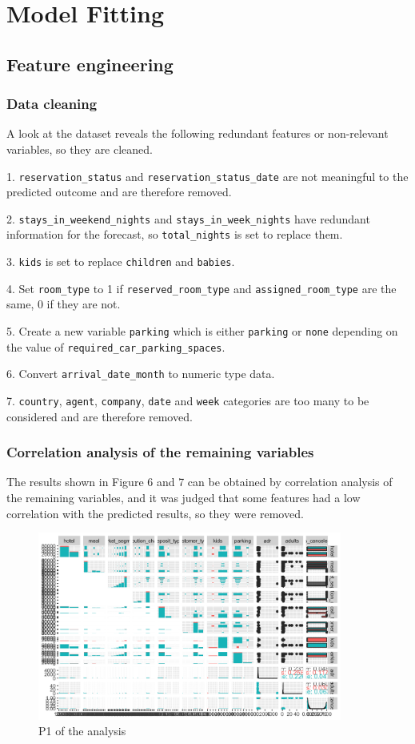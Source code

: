 \documentclass{article}
\begin{document}
\section{Model Fitting}

\subsection{Feature engineering}

\subsubsection{Data cleaning}

A look at the dataset reveals the following redundant features or non-relevant variables, so they are cleaned.

1. \verb|reservation_status| and \verb|reservation_status_date| are not meaningful to the predicted outcome and are therefore removed.

2. \verb|stays_in_weekend_nights| and \verb|stays_in_week_nights| have redundant information for the forecast, so \verb|total_nights| is set to replace them.

3. \verb|kids| is set to replace \verb|children| and \verb|babies|.

4. Set \verb|room_type| to 1 if \verb|reserved_room_type| and \verb|assigned_room_type| are the same, 0 if they are not.

5. Create a new variable \verb|parking| which is either \verb|parking| or \verb|none| depending on the value of \verb|required_car_parking_spaces|.

6. Convert \verb|arrival_date_month| to numeric type data.

7. \verb|country|, \verb|agent|, \verb|company|, \verb|date| and \verb|week| categories are too many to be considered and are therefore removed.


\subsubsection{Correlation analysis of the remaining variables}

The results shown in Figure 6 and 7 can be obtained by correlation analysis of the remaining variables, and it was judged that some features had a low correlation with the predicted results, so they were removed.

\begin{figure}[h]
\centering
\includegraphics[width=10cm]{remain1.png} %
\caption{P1 of the analysis} %
\end{figure}
\end{document}
